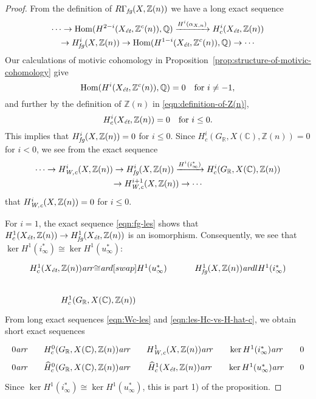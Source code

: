 \documentclass[draft]{article}
\DeclareMathOperator{\Hom}{Hom}
\newcommand{\CC}{\mathbb{C}}
\newcommand{\QQ}{\mathbb{Q}}
\newcommand{\RR}{\mathbb{R}}
\newcommand{\ZZ}{\mathbb{Z}}
\newcommand{\ar}{\text{\it ar}}
\newcommand{\et}{\text{\it \'{e}t}}
\newcommand{\fg}{\text{\it fg}}
\newcommand{\Wc}{\text{\it W,c}}
\theoremstyle{myplain}
\theoremstyle{mydefinition}
\begin{document}
\begin{proof}
  From the definition of $R\Gamma_\fg (X, \ZZ(n))$ we have a long exact
  sequence
  \begin{multline}
    \label{eqn:fg-les}
    \cdots \to \Hom (H^{2-i} (X_\et, \ZZ^c (n)), \QQ) \xrightarrow{H^i (\alpha_{X,n})} H^i_c (X_\et, \ZZ(n)) \\
    \to H^i_\fg (X, \ZZ(n)) \to \Hom (H^{1-i} (X_\et, \ZZ^c (n)), \QQ)
    \to \cdots
  \end{multline}
  Our calculations of motivic cohomology in
  Proposition~\ref{prop:structure-of-motivic-cohomology} give
  $$\Hom (H^i (X_\et, \ZZ^c (n)), \QQ) = 0 \quad \text{for }i \ne -1,$$
  and further by the definition of $\ZZ(n)$ in \eqref{eqn:definition-of-Z(n)},
  $$H^i_c (X_\et, \ZZ(n)) = 0 \quad \text{for }i \le 0.$$
  This implies that $H^i_\fg (X, \ZZ(n)) = 0$ for $i \le 0$.
  Since $H^i_c (G_\RR, X(\CC), \ZZ(n)) = 0$ for $i < 0$, we see from the exact
  sequence
  \begin{multline}
    \label{eqn:Wc-les}
    \cdots \to H^i_\Wc (X, \ZZ(n)) \to
    H^i_\fg (X,\ZZ(n)) \xrightarrow{H^i (i^*_\infty)}
    H^i_c (G_\RR, X(\CC), \ZZ(n)) \\
    \to H^{i+1}_\Wc (X, \ZZ(n)) \to \cdots
  \end{multline}
  that $H^i_\Wc (X, \ZZ(n)) = 0$ for $i \le 0$.

  \vspace{1em}

  For $i = 1$, the exact sequence \eqref{eqn:fg-les} shows that
  $H^1_c (X_\et, \ZZ(n)) \to H^1_\fg (X_\et, \ZZ(n))$ is an isomorphism.
  Consequently, we see that
  $\ker H^1 (i^*_\infty) \cong \ker H^1 (u_\infty^*)$:
  \[ \begin{tikzcd}
      H^1_c (X_\et, \ZZ(n)) \ar{r}{\cong}\ar{d}[swap]{H^1 (u^*_\infty)} & H^1_\fg (X, \ZZ(n)) \ar{dl}{H^1 (i^*_\infty)} \\
      H^1_c (G_\RR, X(\CC), \ZZ(n))
    \end{tikzcd} \]
  From long exact sequences \eqref{eqn:Wc-les} and
  \eqref{eqn:les-Hc-vs-H-hat-c}, we obtain short exact sequences
  \[ \begin{tikzcd}[column sep=1em,row sep=0pt]
      0 \ar{r} & H^0_c (G_\RR, X(\CC), \ZZ(n)) \ar{r} & H^1_\Wc (X, \ZZ(n)) \ar{r} & \ker H^1 (i^*_\infty) \ar{r} & 0 \\
      0 \ar{r} & \widehat{H}^0_c (G_\RR, X(\CC), \ZZ(n)) \ar{r} & \widehat{H}^1_c (X_\et, \ZZ(n)) \ar{r} & \ker H^1 (u_\infty^*) \ar{r} & 0
    \end{tikzcd} \]
  Since $\ker H^1 (i^*_\infty) \cong \ker H^1 (u_\infty^*)$,
  this is part 1) of the proposition.


\end{proof}
\end{document}
